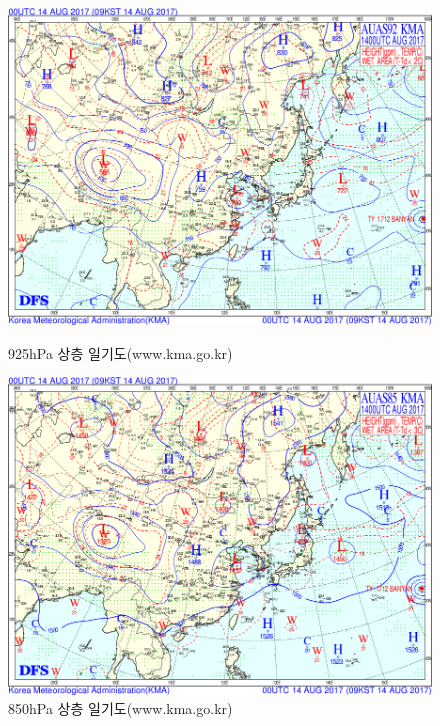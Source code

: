 \begin{figure}[p]\centering
	\begin{minipage}{0.97\textwidth}
	\includegraphics[width=0.97\linewidth]{22Weather_forecasting/images/up92_2017081400}
		\caption{925hPa 상층 일기도(www.kma.go.kr)}
		\label{fig:draw-weathermapsurf92}
	\end{minipage}
	\begin{minipage}{0.97\textwidth}
	\includegraphics[width=0.97\linewidth]{22Weather_forecasting/images/up85_2017081400}
		\caption{850hPa 상층 일기도(www.kma.go.kr)}
		\label{fig:draw-weathermapsurf85}
	\end{minipage}
\end{figure}

